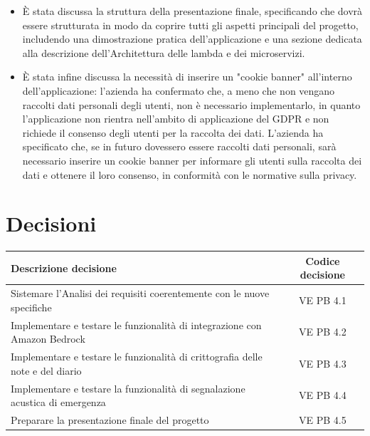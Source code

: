\documentclass[a4paper,12pt]{article}
\newcommand{\ignoreglossary}{}
\begin{document}
\begin{itemize}
\begin{itemize}
    \end{itemize}
    \item È stata discussa la struttura della presentazione finale, specificando che dovrà essere strutturata in modo da coprire tutti gli aspetti principali del progetto, includendo una dimostrazione pratica dell'applicazione e una sezione dedicata alla descrizione dell'Architettura delle lambda e dei microservizi.
    \item È stata infine discussa la necessità di inserire un "cookie banner" all'interno dell'applicazione: l'azienda ha confermato che, a meno che non vengano raccolti dati personali degli utenti, non è necessario implementarlo, in quanto l'applicazione non rientra nell'ambito di applicazione del GDPR e non richiede il consenso degli utenti per la raccolta dei dati. L'azienda ha specificato che, se in futuro dovessero essere raccolti dati personali, sarà necessario inserire un cookie banner per informare gli utenti sulla raccolta dei dati e ottenere il loro consenso, in conformità con le normative sulla privacy.
\end{itemize}   

\section{Decisioni}
\begin{center}
\small
\renewcommand{\arraystretch}{1.2} 
\begin{tabular}{|p{}|c|}
\hline
\rowcolor{gray!60} 
\textbf{Descrizione decisione} & \textbf{Codice decisione} \\
\hline
Sistemare l'Analisi dei requisiti coerentemente con le nuove specifiche & VE \ignoreglossary{PB} 4.1 \\
\hline
Implementare e testare le funzionalità di integrazione con Amazon Bedrock &  VE \ignoreglossary{PB} 4.2 \\
\hline
Implementare e testare le funzionalità di crittografia delle note e del diario &  VE \ignoreglossary{PB} 4.3\\
\hline
Implementare e testare la funzionalità di segnalazione acustica di emergenza &  VE \ignoreglossary{PB} 4.4\\
\hline
Preparare la presentazione finale del progetto &  VE \ignoreglossary{PB} 4.5\\
\hline
\end{tabular}
\end{center}
\end{document}
